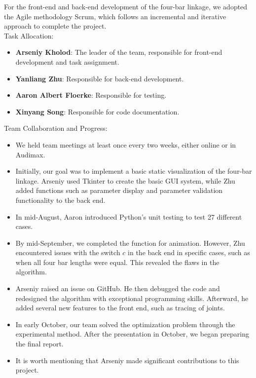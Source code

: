 \documentclass{article}
\begin{document}
For the front-end and back-end development of the four-bar linkage, we adopted the Agile methodology Scrum, which follows an incremental and iterative approach to complete the project.\\

Task Allocation:
\begin{itemize}
    \item \textbf{Arseniy Kholod}: The leader of the team, responsible for front-end development and task assignment.
    \item \textbf{Yanliang Zhu}: Responsible for back-end development.
    \item \textbf{Aaron Albert Floerke}: Responsible for testing.
    \item \textbf{Xinyang Song}: Responsible for code documentation.
\end{itemize}

Team Collaboration and Progress:
\begin{itemize}
    \item We held team meetings at least once every two weeks, either online or in Audimax. 
    \item Initially, our goal was to implement a basic static visualization of the four-bar linkage. Arseniy used Tkinter to create the basic GUI system, while Zhu added functions such as parameter display and parameter validation functionality to the back end.
    \item In mid-August, Aaron introduced Python's unit testing to test 27 different cases.
    \item By mid-September, we completed the function for animation. However, Zhu encountered issues with the switch \(c\) in the back end in specific cases, such as when all four bar lengths were equal. This revealed the flaws in the algorithm.
    \item Arseniy raised an issue on GitHub. He then debugged the code and redesigned the algorithm with exceptional programming skills. Afterward, he added several new features to the front end, such as tracing of joints.
    \item In early October, our team solved the optimization problem through the experimental method. After the presentation in October, we began preparing the final report.  
    \item It is worth mentioning that Arseniy made significant contributions to this project.
\end{itemize}
\end{document}
